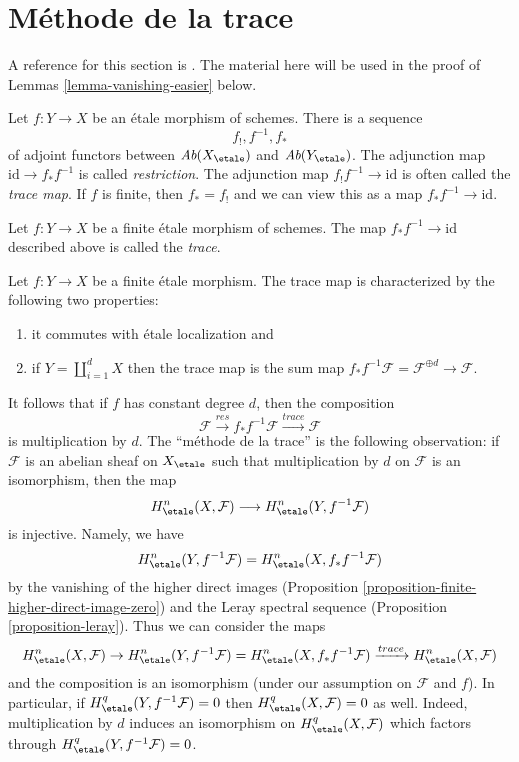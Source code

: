 \section{M\'ethode de la trace}
\label{section-trace-method}

\noindent
A reference for this section is \cite[Expos\'e IX, \S 5]{SGA4}.
The material here will be used in the proof of
Lemmas \ref{lemma-vanishing-easier} below.

\medskip\noindent
Let $f : Y \to X$ be an \'etale morphism of schemes. There
is a sequence
$$
f_!, f^{-1}, f_*
$$
of adjoint functors between
$\textit{Ab}(X_\etale)$ and $\textit{Ab}(Y_\etale)$. The
adjunction map $\text{id} \to f_* f^{-1}$ is called {\it restriction}.
The adjunction map $f_! f^{-1} \to \text{id}$ is often
called the {\it trace map}. If $f$ is finite, then $f_* = f_!$ and
we can view this as a map $f_*f^{-1} \to \text{id}$.

\begin{definition}
\label{definition-trace-map}
Let $f : Y \to X$ be a finite \'etale morphism of schemes.
The map $f_* f^{-1} \to \text{id}$ described above is called the {\it trace}.
\end{definition}

\noindent
Let $f : Y \to X$ be a finite \'etale morphism. The trace map is
characterized by the following two properties:
\begin{enumerate}
\item it commutes with \'etale localization and
\item if $Y = \coprod_{i = 1}^d X$ then the trace map is
the sum map $f_*f^{-1} \mathcal{F} = \mathcal{F}^{\oplus d} \to \mathcal{F}$.
\end{enumerate}
It follows that if $f$ has constant degree $d$, then the composition
$$
\mathcal{F} \xrightarrow{res}
f_* f^{-1} \mathcal{F} \xrightarrow{trace}
\mathcal{F}
$$
is multiplication by $d$. The ``m\'ethode de la trace''
is the following observation: if $\mathcal{F}$
is an abelian sheaf on $X_\etale$ such that multiplication by $d$
on $\mathcal{F}$ is an isomorphism, then the map
$$
H^n_\etale(X, \mathcal{F}) \longrightarrow H^n_\etale(Y, f^{-1}\mathcal{F})
$$
is injective. Namely, we have
$$
H^n_\etale(Y, f^{-1}\mathcal{F}) = H^n_\etale(X, f_*f^{-1}\mathcal{F})
$$
by the vanishing of the higher direct images
(Proposition \ref{proposition-finite-higher-direct-image-zero})
and the Leray spectral sequence
(Proposition \ref{proposition-leray}).
Thus we can consider the maps
$$
H^n_\etale(X, \mathcal{F}) \to
H^n_\etale(Y, f^{-1}\mathcal{F})= H^n_\etale(X, f_*f^{-1}\mathcal{F})
\xrightarrow{trace}
H^n_\etale(X, \mathcal{F})
$$
and the composition is an isomorphism (under our assumption on $\mathcal{F}$
and $f$). In particular, if
$H_\etale^q(Y, f^{-1}\mathcal{F}) = 0$ then
$H_\etale^q(X, \mathcal{F}) = 0$ as well.
Indeed, multiplication by $d$ induces an
isomorphism on $H_\etale^q(X, \mathcal{F})$ which factors through
$H_\etale^q(Y, f^{-1}\mathcal{F})= 0$.

